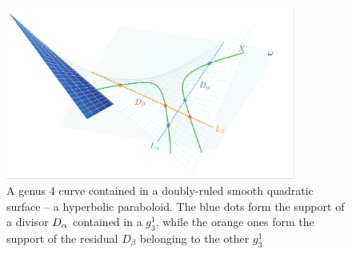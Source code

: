  	\begin{example}\label{ex:smooth_quadric}

 		\begin{figure}[h]
			\centering
			\includegraphics[width=0.85\textwidth]{Pringles2.pdf}
			\caption{ A genus $4$ curve contained in a doubly-ruled smooth quadratic surface -- a hyperbolic paraboloid. The blue dots form the support of a divisor $D_\alpha$ contained in a $g_3^1$, while the orange ones form the support of the residual $D_\beta$ belonging to the other $g_3^1$ }
			\label{fig:Pringles}
		\end{figure}


\end{example}
